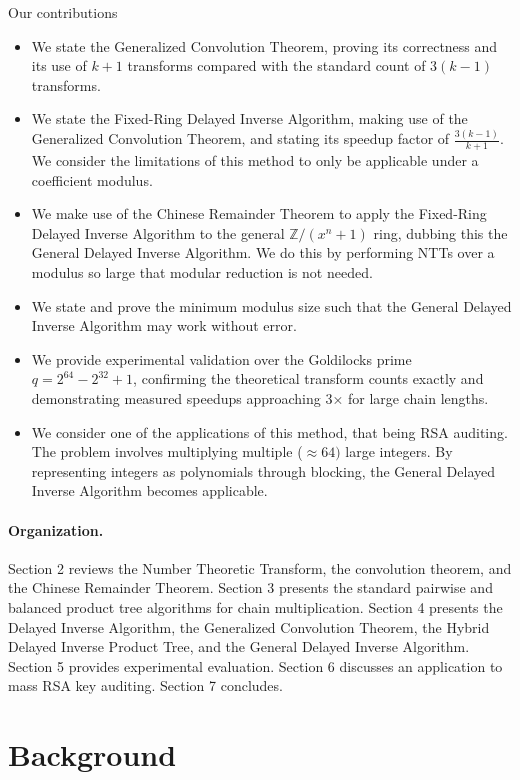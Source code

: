 \documentclass[runningheads]{llncs}
\begin{document}
Our contributions 
\begin{itemize}
    \item We state the Generalized Convolution Theorem, proving its correctness and its use of $k+1$ transforms compared with the standard count of $3(k-1)$ transforms.
    \item We state the Fixed-Ring Delayed Inverse Algorithm, making use of the Generalized Convolution Theorem, and stating its speedup factor of $\frac{3(k-1)}{k+1}$. We consider the limitations of this method to only be applicable under a coefficient modulus.
    \item We make use of the Chinese Remainder Theorem to apply the Fixed-Ring Delayed Inverse Algorithm to the general $\mathbb{Z}/(x^n+1)$ ring, dubbing this the General Delayed Inverse Algorithm. We do this by performing NTTs over a modulus so large that modular reduction is not needed. 
    \item We state and prove the minimum modulus size such that the General Delayed Inverse Algorithm may work without error.
    \item We provide experimental validation over the Goldilocks prime $q = 2^{64} - 2^{32} + 1$, confirming the theoretical transform counts exactly and demonstrating measured speedups approaching 3× for large chain lengths.
    \item We consider one of the applications of this method, that being RSA auditing. The problem involves multiplying multiple ($\approx 64)$ large integers. By representing integers as polynomials through blocking, the General Delayed Inverse Algorithm becomes applicable.
\end{itemize}


\paragraph{Organization.} Section 2 reviews the Number Theoretic Transform, the convolution theorem, and the Chinese Remainder Theorem. Section 3 presents the standard pairwise and balanced product tree algorithms for chain multiplication. Section 4 presents the Delayed Inverse Algorithm, the Generalized Convolution Theorem, the Hybrid Delayed Inverse Product Tree, and the General Delayed Inverse Algorithm. Section 5 provides experimental evaluation. Section 6 discusses an application to mass RSA key auditing. Section 7 concludes.

\section{Background}
\end{document}

